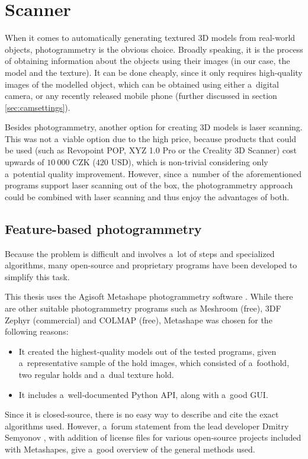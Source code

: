 \chapter{Scanner}\label{sec:scanner}
When it comes to automatically generating textured 3D models from real-world objects, photogrammetry is the obvious choice.
Broadly speaking, it is the process of obtaining information about the objects using their images (in our case, the model and the texture).
It can be done cheaply, since it only requires high-quality images of the modelled object, which can be obtained using either a~digital camera, or any recently released mobile phone (further discussed in section \ref{sec:camsettings}).

Besides photogrammetry, another option for creating 3D models is laser scanning.
This was not a~viable option due to the high price, because products that could be used (such as Revopoint POP, XYZ 1.0 Pro or the Creality 3D Scanner) cost upwards of $10\ 000$ CZK ($420$ USD), which is non-trivial considering only a~potential quality improvement.
However, since a~number of the aforementioned programs support laser scanning out of the box, the photogrammetry approach could be combined with laser scanning and thus enjoy the advantages of both.

\section{Feature-based photogrammetry}
Because the problem is difficult and involves a~lot of steps and specialized algorithms, many open-source and proprietary programs have been developed to simplify this task.

This thesis uses the Agisoft Metashape photogrammetry software \cite{metashape}.
While there are other suitable photogrammetry programs such as Meshroom (free), 3DF Zephyr (commercial) and COLMAP (free), Metashape was chosen for the following reasons:
\begin{itemize}
	\item It created the highest-quality models out of the tested programs, given a~representative sample of the hold images, which consisted of a~foothold, two regular holds and a~dual texture hold.
	\item It includes a~well-documented Python API, along with a~good GUI.
\end{itemize}

Since it is closed-source, there is no easy way to describe and cite the exact algorithms used.
However, a~forum statement from the lead developer Dmitry Semyonov \parencite{metashapeForumPost}, with addition of license files for various open-source projects included with Metashapes, give a~good overview of the general methods used.

